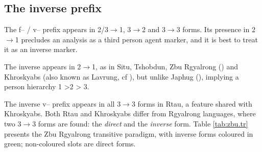 \documentclass[oneside,a4paper,11pt]{article}
\newcommand{\ipa}[1]{{\phon #1}} %
\begin{document}
\subsection{The inverse prefix}
The \ipa{f}-- / \ipa{v}-- prefix appears in 2/3$\rightarrow$1, 3$\rightarrow$2 and 3$\rightarrow$3 forms. Its presence  in 2$\rightarrow$1 precludes an analysis as a third person agent marker, and it is best to treat it as an inverse marker.

The inverse appears in 2$\rightarrow$1, as in Situ, Tshobdun, Zbu Rgyalrong (\citealt{delancey81direction, jackson02rentongdengdi, gongxun14agreement}) and Khroskyabs (also known as Lavrung, cf \citealt{lai13affixale}), but unlike Japhug (\citealt{jacques10inverse}), implying a person hierarchy  1 >2 > 3. 



The inverse \ipa{v}-- prefix appears in all 3$\rightarrow$3 forms in Rtau, a feature shared with Khroskyabs. Both Rtau and Khroskyabs differ from Rgyalrong languages, where two 3$\rightarrow$3 forms are found: the \textit{direct}   and the \textit{inverse} form. Table \ref{tab:zbu.tr} presents the Zbu Rgyalrong transitive paradigm, with inverse forms coloured in green; non-coloured slots are direct forms.
\end{document}
